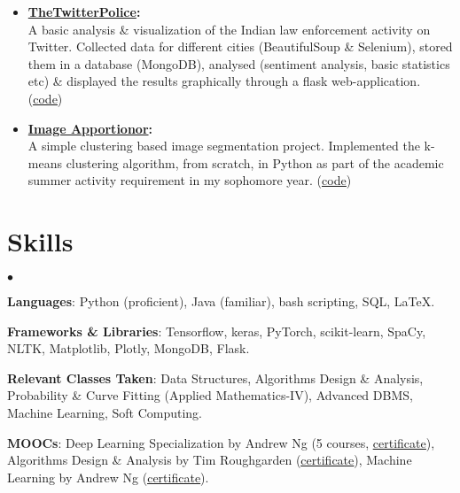 \documentclass[margin,line]{res}
\newenvironment{list2}{
  \begin{list}{$\bullet$}{%
      \setlength{\itemsep}{0in}
      \setlength{\parsep}{0in} \setlength{\parskip}{0in}
      \setlength{\topsep}{0in} \setlength{\partopsep}{0in}
      \setlength{\leftmargin}{0.2in}}}{\end{list}}
\begin{document}
\begin{resume}
\begin{itemize}[leftmargin=*]
\begin{itemize}[leftmargin=*]
\end{itemize}
\item {\bf {\href{https://github.com/sominwadhwa/TheTwitterPolice}{TheTwitterPolice}:}}\\
A basic analysis \& visualization of the Indian law enforcement activity on Twitter. Collected data for different cities (BeautifulSoup \& Selenium), stored them in a database (MongoDB), analysed (sentiment analysis, basic statistics etc) \& displayed the results graphically through a flask web-application. ({\href{https://github.com/sominwadhwa/TheTwitterPolice}{\underline{code}}})
\item {\bf {\href{https://github.com/sominwadhwa/Image-Apportionor}{Image Apportionor}:}}\\
A simple clustering based image segmentation project. Implemented the k-means clustering algorithm, from scratch, in Python as part of the academic summer activity requirement in my sophomore year. ({\href{https://github.com/sominwadhwa/TheTwitterPolice}{\underline{code}}})
\end{itemize}

\iffalse
\section{\sc Technical Skills}
{\bf Strongest Areas}: Machine Learning (Classification, Regression, Feature Engineering), Algorithms, Statistical Data Analysis\\
{\bf Languages/Tools/Software}: Python (scikit-learn, Keras, NumPy, Pandas \& others), Java, SQL, MongoDB, \LaTeX, MS Excel
\fi

\section{\sc Skills}
\begin{list2}
\item {\bf Languages}: Python (proficient), Java (familiar), bash scripting, SQL, \LaTeX. 
\item {\bf Frameworks \& Libraries}: Tensorflow, keras, PyTorch, scikit-learn, SpaCy, NLTK, Matplotlib, Plotly, MongoDB, Flask.
\item {\bf Relevant Classes Taken}: Data Structures, Algorithms Design \& Analysis, Probability \& Curve Fitting (Applied Mathematics-IV), Advanced DBMS, Machine Learning, Soft Computing.
\item {\bf MOOCs}: Deep Learning Specialization by Andrew Ng (5 courses, {\href{https://www.coursera.org/account/accomplishments/specialization/WK4DU58W9DV5}{\underline{certificate}}}), Algorithms Design \& Analysis by Tim Roughgarden ({\href{https://www.coursera.org/account/accomplishments/verify/S8RN7R4ZZQSR}{\underline{certificate}}}), Machine Learning by Andrew Ng ({\href{https://www.coursera.org/account/accomplishments/verify/37T4VG9ZN7EY}{\underline{certificate}}}).
\end{list2}


\end{resume}
\end{document}
